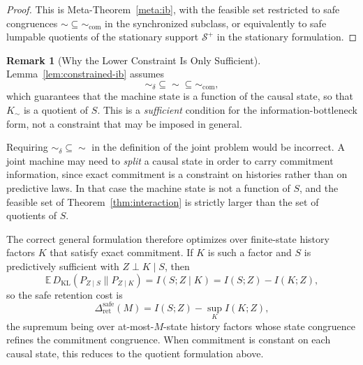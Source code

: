 \documentclass[12pt]{article}
\theoremstyle{definition}
\newtheorem{remark}[theorem]{Remark}
\newcommand{\Splus}{\mathcal S^{+}}
\begin{document}
\begin{proof}
This is Meta-Theorem~\ref{meta:ib}, with the feasible set restricted to safe
congruences $\sim\subseteq\sim_{\mathrm{com}}$ in the synchronized subclass,
or equivalently to safe lumpable quotients of the stationary support
$\Splus$ in the stationary formulation.
\end{proof}

\begin{remark}[Why the Lower Constraint Is Only Sufficient]
\label{rem:no-lower-constraint}
Lemma~\ref{lem:constrained-ib} assumes
\[
\sim_\delta\subseteq\sim\subseteq\sim_{\mathrm{com}},
\]
which guarantees that the machine state is a function of the causal state, so
that $K_\sim$ is a quotient of $S$.  This is a \emph{sufficient} condition for
the information-bottleneck form, not a constraint that may be imposed in
general.

Requiring $\sim_\delta\subseteq\sim$ in the definition of the joint problem
would be incorrect.  A joint machine may need to \emph{split} a causal state
in order to carry commitment information, since exact commitment is a
constraint on histories rather than on predictive laws.  In that case the
machine state is not a function of $S$, and the feasible set of
Theorem~\ref{thm:interaction} is strictly larger than the set of quotients of
$S$.

The correct general formulation therefore optimizes over finite-state history
factors $K$ that satisfy exact commitment.  If $K$ is such a factor and $S$ is
predictively sufficient with $Z\perp K\mid S$, then
\[
\mathbb E\,D_{\mathrm{KL}}(P_{Z\mid S}\|P_{Z\mid K})
=
I(S;Z\mid K)
=
I(S;Z)-I(K;Z),
\]
so the safe retention cost is
\[
\Delta_{\mathrm{ret}}^{\mathrm{safe}}(M)
=
I(S;Z)
-
\sup_{K}
I(K;Z),
\]
the supremum being over at-most-$M$-state history factors whose state
congruence refines the commitment congruence.  When commitment is constant on
each causal state, this reduces to the quotient formulation above.
\end{remark}
\end{document}
